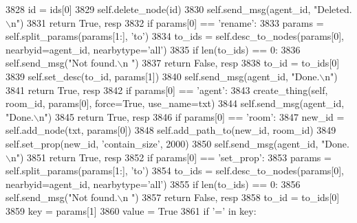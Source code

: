 \begin{DoxyCode}
3828             id = ids[0]
3829             self.delete\_node(id)
3830             self.send\_msg(agent\_id, \textcolor{stringliteral}{"Deleted.\(\backslash\)n"})
3831             \textcolor{keywordflow}{return} \textcolor{keyword}{True}, resp
3832         \textcolor{keywordflow}{if} params[0] == \textcolor{stringliteral}{'rename'}:
3833             params = self.split\_params(params[1:], \textcolor{stringliteral}{'to'})
3834             to\_ids = self.desc\_to\_nodes(params[0], nearbyid=agent\_id, nearbytype=\textcolor{stringliteral}{'all'})
3835             \textcolor{keywordflow}{if} len(to\_ids) == 0:
3836                 self.send\_msg(\textcolor{stringliteral}{"Not found.\(\backslash\)n "})
3837                 \textcolor{keywordflow}{return} \textcolor{keyword}{False}, resp
3838             to\_id = to\_ids[0]
3839             self.set\_desc(to\_id, params[1])
3840             self.send\_msg(agent\_id, \textcolor{stringliteral}{"Done.\(\backslash\)n"})
3841             \textcolor{keywordflow}{return} \textcolor{keyword}{True}, resp
3842         \textcolor{keywordflow}{if} params[0] == \textcolor{stringliteral}{'agent'}:
3843             create\_thing(self, room\_id, params[0], force=\textcolor{keyword}{True}, use\_name=txt)
3844             self.send\_msg(agent\_id, \textcolor{stringliteral}{"Done.\(\backslash\)n"})
3845             \textcolor{keywordflow}{return} \textcolor{keyword}{True}, resp
3846         \textcolor{keywordflow}{if} params[0] == \textcolor{stringliteral}{'room'}:
3847             new\_id = self.add\_node(txt, params[0])
3848             self.add\_path\_to(new\_id, room\_id)
3849             self.set\_prop(new\_id, \textcolor{stringliteral}{'contain\_size'}, 2000)
3850             self.send\_msg(agent\_id, \textcolor{stringliteral}{"Done.\(\backslash\)n"})
3851             \textcolor{keywordflow}{return} \textcolor{keyword}{True}, resp
3852         \textcolor{keywordflow}{if} params[0] == \textcolor{stringliteral}{'set\_prop'}:
3853             params = self.split\_params(params[1:], \textcolor{stringliteral}{'to'})
3854             to\_ids = self.desc\_to\_nodes(params[0], nearbyid=agent\_id, nearbytype=\textcolor{stringliteral}{'all'})
3855             \textcolor{keywordflow}{if} len(to\_ids) == 0:
3856                 self.send\_msg(\textcolor{stringliteral}{"Not found.\(\backslash\)n "})
3857                 \textcolor{keywordflow}{return} \textcolor{keyword}{False}, resp
3858             to\_id = to\_ids[0]
3859             key = params[1]
3860             value = \textcolor{keyword}{True}
3861             \textcolor{keywordflow}{if} \textcolor{stringliteral}{'='} \textcolor{keywordflow}{in} key:

\end{DoxyCode}
